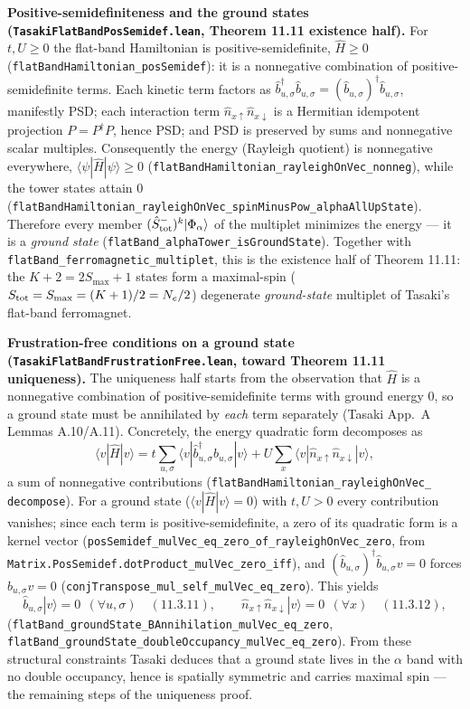 \documentclass[a4paper,11pt]{article}
\begin{document}
\medskip
\noindent\textbf{Positive-semidefiniteness and the ground states
(\texttt{TasakiFlatBandPosSemidef.lean}, Theorem 11.11 existence half).}
For $t, U\geq 0$ the flat-band Hamiltonian is positive-semidefinite,
$\hat H\geq 0$ (\texttt{flatBandHamiltonian\_posSemidef}): it is a nonnegative
combination of positive-semidefinite terms. Each kinetic term factors as
$\hat b^\dagger_{u,\sigma}\hat b_{u,\sigma} = (\hat b_{u,\sigma})^\dagger
\hat b_{u,\sigma}$, manifestly PSD; each interaction term $\hat n_{x\uparrow}
\hat n_{x\downarrow}$ is a Hermitian idempotent projection $P = P^\dagger P$, hence
PSD; and PSD is preserved by sums and nonnegative scalar multiples. Consequently
the energy (Rayleigh quotient) is nonnegative everywhere,
$\langle\psi|\hat H|\psi\rangle\geq 0$
(\texttt{flatBandHamiltonian\_rayleighOnVec\_nonneg}), while the tower states attain
$0$ (\texttt{flatBandHamiltonian\_rayleighOnVec\_spinMinusPow\_alphaAllUpState}).
Therefore every member $(\hat S^-_{\rm tot})^k|\Phi_\alpha\rangle$ of the multiplet
minimizes the energy --- it is a \emph{ground state}
(\texttt{flatBand\_alphaTower\_isGroundState}). Together with
\texttt{flatBand\_ferromagnetic\_multiplet}, this is the existence half of
Theorem 11.11: the $K+2 = 2S_{\max}+1$ states form a maximal-spin
($S_{\rm tot} = S_{\max} = (K+1)/2 = N_e/2$) degenerate \emph{ground-state}
multiplet of Tasaki's flat-band ferromagnet.

\medskip
\noindent\textbf{Frustration-free conditions on a ground state
(\texttt{TasakiFlatBandFrustrationFree.lean}, toward Theorem 11.11 uniqueness).}
The uniqueness half starts from the observation that $\hat H$ is a nonnegative
combination of positive-semidefinite terms with ground energy $0$, so a ground
state must be annihilated by \emph{each} term separately (Tasaki App.~A
Lemmas A.10/A.11). Concretely, the energy quadratic form decomposes as
\[
  \langle v|\hat H|v\rangle
    = t\sum_{u,\sigma}\langle v|\hat b^\dagger_{u,\sigma}\hat b_{u,\sigma}|v\rangle
      + U\sum_x \langle v|\hat n_{x\uparrow}\hat n_{x\downarrow}|v\rangle,
\]
a sum of nonnegative contributions (\texttt{flatBandHamiltonian\_rayleighOnVec\_%
decompose}). For a ground state ($\langle v|\hat H|v\rangle = 0$) with
$t, U > 0$ every contribution vanishes; since each term is positive-semidefinite,
a zero of its quadratic form is a kernel vector
(\texttt{posSemidef\_mulVec\_eq\_zero\_of\_rayleighOnVec\_zero}, from
\texttt{Matrix.PosSemidef.dotProduct\_mulVec\_zero\_iff}), and
$(\hat b_{u,\sigma})^\dagger \hat b_{u,\sigma} v = 0$ forces
$\hat b_{u,\sigma} v = 0$ (\texttt{conjTranspose\_mul\_self\_mulVec\_eq\_zero}).
This yields
\[
  \hat b_{u,\sigma}|v\rangle = 0\ \ (\forall u,\sigma) \quad (11.3.11),
  \qquad
  \hat n_{x\uparrow}\hat n_{x\downarrow}|v\rangle = 0\ \ (\forall x) \quad (11.3.12),
\]
(\texttt{flatBand\_groundState\_BAnnihilation\_mulVec\_eq\_zero},
\texttt{flatBand\_groundState\_doubleOccupancy\_mulVec\_eq\_zero}). From these
structural constraints Tasaki deduces that a ground state lives in the $\alpha$
band with no double occupancy, hence is spatially symmetric and carries maximal
spin --- the remaining steps of the uniqueness proof.
\end{document}
